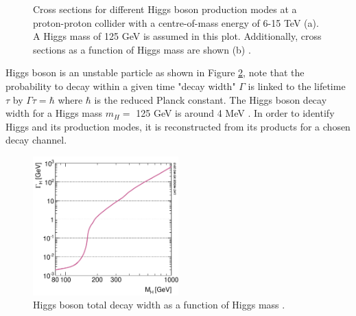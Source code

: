 \begin{figure}[htbp]
    \centering
    \caption{Cross sections for different Higgs boson production modes at a proton-proton collider with a centre-of-mass energy of 6-15 TeV (a). A Higgs mass of 125 GeV is assumed in this plot. Additionally, cross sections as a function of Higgs mass are shown (b) \cite{LHCHXSWG_Twiki}.}
    \label{fig:chap1:EWSB:HXSEC}
\end{figure}
Higgs boson is an unstable particle as shown in Figure \ref{fig:chap1:EWSB:D}, note that the probability to decay within a given time "decay width" $\Gamma$ is linked to the lifetime $\tau$ by $ \Gamma\tau = \hbar$ where $\hbar$ is the reduced Planck constant. The Higgs boson decay width for a Higgs mass $m_{H} = $ 125 GeV is around 4 MeV \cite{CMS_HiggsWidth}. In order to identify Higgs and its production modes, it is reconstructed from its products for a chosen decay channel. 
\begin{figure}[htbp]
    \centering
    \includegraphics[width=0.5\textwidth]{Ch1/Img/Higgs_decay.png}
    \caption{Higgs boson total decay width as a function of Higgs mass \cite{HiggsWidth}.}
    \label{fig:chap1:EWSB:D}
\end{figure}

